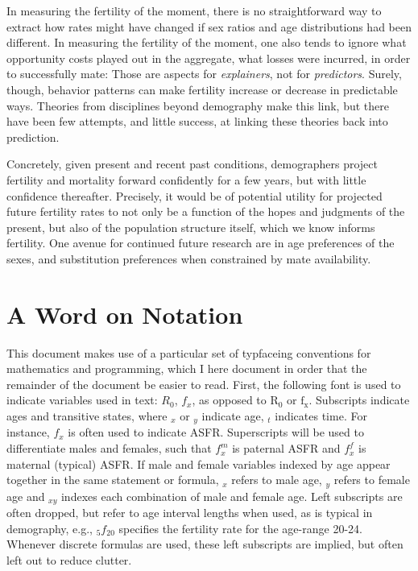 \documentclass[reqno,12pt,oneside,a4paper]{report} %
\theoremstyle{plain}
\theoremstyle{definition}
\theoremstyle{remark}
\numberwithin{theorem}{chapter}     %
\begin{document}
In measuring the fertility of the moment, there is no straightforward way to extract how rates might have changed if sex ratios and age distributions had been different. In measuring the fertility of the moment, one also tends to ignore what opportunity costs played out in the aggregate, what losses were incurred, in order to successfully mate: Those are aspects for \textit{explainers}, not for \textit{predictors}. Surely, though, behavior patterns can make fertility increase or decrease in predictable ways. Theories from disciplines beyond demography make this link, but there have been few attempts, and little success, at linking these theories back into prediction. 

Concretely, given present and recent past conditions, demographers project fertility and mortality forward confidently for a few years, but with little confidence thereafter. Precisely, it would be of potential utility for projected future fertility rates to not only be a function of the hopes and judgments of the present, but also of the population structure itself, which we know informs fertility. One avenue for continued future research are in age preferences of the sexes, and substitution preferences when constrained by mate availability. 

\section{A Word on Notation}
This document makes use of a particular set of typfaceing conventions for mathematics and programming, which I here document in order that the remainder of the document be easier to read. First, the following font is used to indicate variables used in text: $R_0$, $f_x$, as opposed to $\text{R}_{\text{0}}$ or $\text{f}_{\text{x}}$. Subscripts indicate ages and transitive states, where ${}_x$ or ${}_y$ indicate age, ${}_t$ indicates time. For instance, $f_x$ is often used to indicate ASFR. Superscripts will be used to differentiate males and females, such that $f_x ^m$ is paternal ASFR and $f_x ^f$ is maternal (typical) ASFR. If male and female variables indexed by age appear together in the same statement or formula, ${}_x$ refers to male age, ${}_y$ refers to female age and ${}_{xy}$ indexes each combination of male and female age. Left subscripts are often dropped, but refer to age interval lengths when used, as is typical in demography, e.g., ${}_5f_20$ specifies the fertility rate for the age-range 20-24. Whenever discrete formulas are used, these left subscripts are implied, but often left out to reduce clutter.
\end{document}
